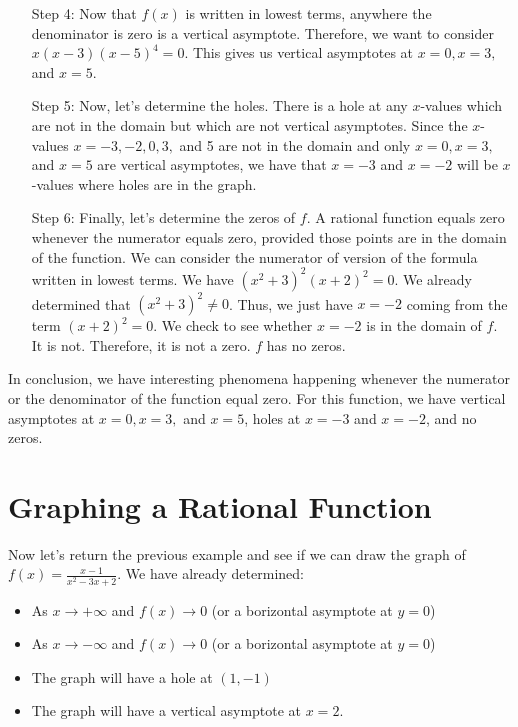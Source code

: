 \documentclass{ximera}
\begin{document}
\begin{example}
\begin{explanation}
\begin{enumerate}
\item[Step 4:]  Now that $f(x)$ is written in lowest terms, anywhere the denominator is zero is a vertical asymptote.  Therefore, we want to consider $x(x-3)(x-5)^{4}=0$.  This gives us vertical asymptotes at $x=0, x=3,$ and $x=5$.

\item[Step 5:]  Now, let's determine the holes.  There is a hole at any $x$-values which are not in the domain but which are not vertical asymptotes.  Since the $x$-values $x =-3, -2, 0, 3,$ and 5 are not in the domain and only   $x=0, x=3,$ and $x=5$ are vertical asymptotes, we have that $x=-3$ and $x=-2$ will be $x$-values where holes are in the graph.

\item[Step 6:]  Finally, let's determine the zeros of $f$.  A rational function equals zero whenever the numerator equals zero, provided those points are in the domain of the function.  We can consider the numerator of version of the formula written in lowest terms.  We have $(x^2+3)^2(x+2)^{2}=0$.  We already determined that $(x^2+3)^2 \neq 0$.  Thus, we just have $x=-2$ coming from the term $(x+2)^2=0$.  We check to see whether $x=-2$ is in the domain of $f$.  It is not.  Therefore, it is not a zero.  $f$ has no zeros.
\end{enumerate}

In conclusion, we have interesting phenomena happening whenever the numerator or the denominator of the function equal zero.  For this function, we have vertical asymptotes at $x=0, x=3,$ and $x=5$, holes at $x=-3$ and $x=-2$, and no zeros.
\end{explanation}
\end{example}


\section{Graphing a Rational Function}

Now let's return the previous example and see if we can draw the graph of $f(x)=\frac{x-1}{x^2-3x+2}$.  We have already determined:

\begin{itemize}
\item As $x \to +\infty$ and $f(x) \to 0$ (or a borizontal asymptote at $y=0$)
\item As $x \to -\infty$ and $f(x) \to 0$ (or a borizontal asymptote at $y=0$)
\item The graph will have a hole at $(1,-1)$
\item The graph will have a vertical asymptote at $x=2$.
\end{itemize}
\end{document}

